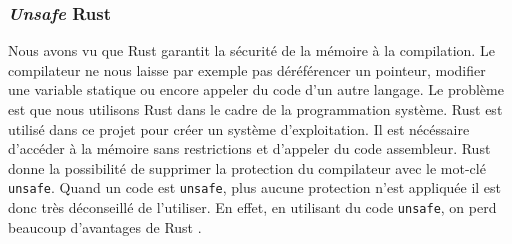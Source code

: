 \subsubsection{\textit{Unsafe} Rust}
Nous avons vu que Rust garantit la sécurité de la mémoire à la compilation.
Le compilateur ne nous laisse par exemple pas déréférencer un pointeur, modifier
une variable statique ou encore appeler du code d'un autre langage.
Le problème est que nous utilisons Rust dans le cadre de la programmation système.
Rust est utilisé dans ce projet pour créer un système d'exploitation. Il est nécéssaire
d'accéder à la mémoire sans restrictions et d'appeler du code assembleur. Rust donne
la possibilité de supprimer la protection du compilateur avec le mot-clé
\texttt{unsafe}. Quand un code est \texttt{unsafe}, plus aucune
protection n'est appliquée il est donc très déconseillé de l'utiliser. En effet,
en utilisant du code \texttt{unsafe}, on perd beaucoup d'avantages de Rust
\cite{ref2}.